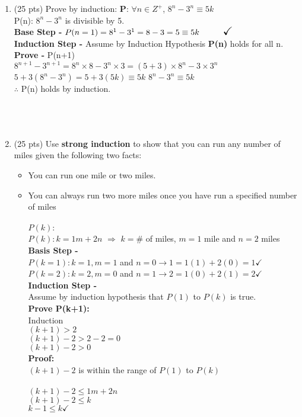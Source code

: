 \documentclass[11pt]{article}
\newcommand\tab[1][1cm]{\hspace*{#1}}
\begin{document}
\begin{enumerate}
  \item (25 pts) Prove by induction: {\bf P}: $\forall n\in Z^+$, $8^n-3^n \equiv 5k$ \\
    \tab P(n): $8^n-3^n$ is divisible by 5. \\
    \tab \textbf{Base Step -} $ P(n=1) = 8^1-3^1 = 8-3=5 \equiv 5k\tab{\Large\checkmark}$ \\
    \tab \textbf{Induction Step -} Assume by Induction Hypothesis \textbf{P(n)} holds for all n.  \\
    \tab \textbf{Prove -}  P(n+1) \\
    \tab\tab $ 8^{n+1}-3^{n+1} = 8^n\times8-3^n\times3 = (5+3)\times8^n - 3\times3^n$ \\
    \tab\tab $ 5 + 3(8^n-3^n) = 5 +3(5k) \equiv 5k$ \tab\tab\tab\tab$8^n-3^n \equiv 5k $ \\
    \tab\tab\tab $\therefore$ P(n) holds by induction. {\Large \checkmark}\\\\\\\\
  

  \item (25 pts) Use \textbf{strong induction} to show that you can run any number of miles given the following two facts:	
  \begin{itemize}
    \item You can run one mile or two miles. 
    \item You can always run two more miles once you have run a specified number of miles \\\\
    $P(k): $ \\
    $P(k): k=1m+2n$ $\Rightarrow$ $k=\#$ of miles, $m=1$ mile and $n=2$ miles \\
    \textbf{Basis Step -} \\
    \tab$P(k=1): k=1, m=1$ and $n=0 \rightarrow 1=1(1)+2(0) = 1 \checkmark$ \\
    \tab$P(k=2): k=2, m=0$ and $n=1 \rightarrow 2=1(0)+2(1) = 2 \checkmark$ \\
    \textbf{Induction Step -} \\
    \tab Assume by induction hypothesis that $P(1)$ to $P(k)$ is true.\\
    \tab\textbf{Prove P(k+1):} \\
    \tab\tab Induction \\
    \tab\tab\tab$(k+1) > 2$ \\
    \tab\tab\tab$(k+1)-2 > 2-2=0$ \\
    \tab\tab\tab$(k+1)-2 > 0$ \\
    \tab\tab \textbf{Proof:} \\
    \tab\tab\tab $(k+1)-2$ is within the range of $P(1)$ to $P(k)$\\\\
    \tab\tab\tab$(k+1)-2 \leq 1m+2n$ \\
    \tab\tab\tab$(k+1)-2 \leq k$ \\
    \tab\tab\tab$k-1 \leq k \checkmark$\\
        
    \end{itemize}


\end{enumerate}
\end{document}
